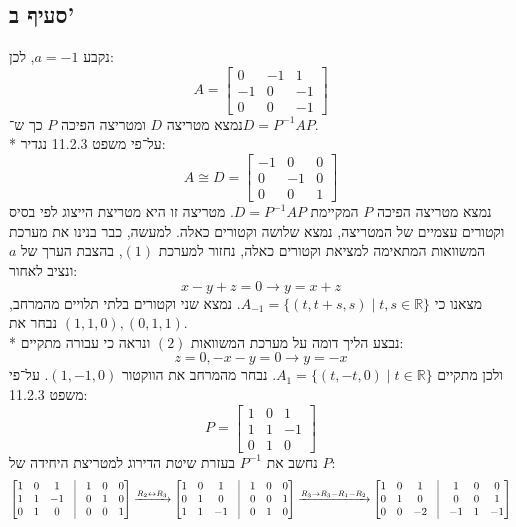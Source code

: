 \documentclass[a4paper,10pt]{article}
\begin{document}
\subsection{סעיף ב'}
נקבע $a = -1$, לכן:
\[
	A=
	\begin{bmatrix}
		0 & -1 & 1 \\
		-1 & 0 & -1 \\
		0 & 0 & -1
	\end{bmatrix}
\]
נמצא מטריצה $D$ ומטריצה הפיכה $P$ כך ש־$D = P^{-1} A P$. \\*
על־פי משפט 11.2.3 נגדיר:
\[
	A \cong D =
	\begin{bmatrix}
		-1 & 0 & 0 \\
		0 & -1 & 0 \\
		0 & 0 & 1
	\end{bmatrix}
\]
נמצא מטריצה הפיכה $P$ המקיימת $D = P^{-1} A P$.
מטריצה זו היא מטריצת הייצוג לפי בסיס וקטורים עצמיים של המטריצה,
נמצא שלושה וקטורים כאלה. למעשה,
כבר בנינו את מערכת המשוואות המתאימה למציאת וקטורים כאלה,
נחזור למערכת $(1)$, בהצבת הערך של $a$ ונציב לאחור:
\[
	x - y + z = 0 \rightarrow y = x + z
\]
מצאנו כי $A_{-1} = \{(t, t + s, s) \mid t, s \in \mathbb{R} \}$.
נמצא שני וקטורים בלתי תלויים מהמרחב, נבחר את $(1, 1, 0), (0, 1, 1)$. \\*
נבצע הליך דומה על מערכת המשוואות $(2)$ ונראה כי עבורה מתקיים:
\[
	z = 0, -x -y = 0 \rightarrow y = -x
\]
ולכן מתקיים $A_1 = \{(t, -t, 0) \mid t \in \mathbb{R} \}$.
נבחר מהמרחב את הווקטור $(1, -1, 0)$.
על־פי משפט 11.2.3:
\[
	P =
	\begin{bmatrix}
		1 & 0 & 1 \\
		1 & 1 & -1 \\
		0 & 1 & 0
	\end{bmatrix}
\]
נחשב את $P^{-1}$ בעזרת שיטת הדירוג למטריצת היחידה של $P$:
\[
	\begin{bmatrix}
		1 & 0 & 1 & \vline & 1 & 0 & 0 \\
		1 & 1 & -1 & \vline & 0 & 1 & 0 \\
		0 & 1 & 0 & \vline & 0 & 0 & 1
	\end{bmatrix}
	\xrightarrow{R_2 \leftrightarrow R_3}
	\begin{bmatrix}
		1 & 0 & 1 & \vline & 1 & 0 & 0 \\
		0 & 1 & 0 & \vline & 0 & 0 & 1 \\
		1 & 1 & -1 & \vline & 0 & 1 & 0
	\end{bmatrix}
	\xrightarrow{R_3 \rightarrow R_3 - R_1 - R_2}
	\begin{bmatrix}
		1 & 0 & 1 & \vline & 1 & 0 & 0 \\
		0 & 1 & 0 & \vline & 0 & 0 & 1 \\
		0 & 0 & -2 & \vline & -1 & 1 & -1
	\end{bmatrix}
\]
\end{document}
